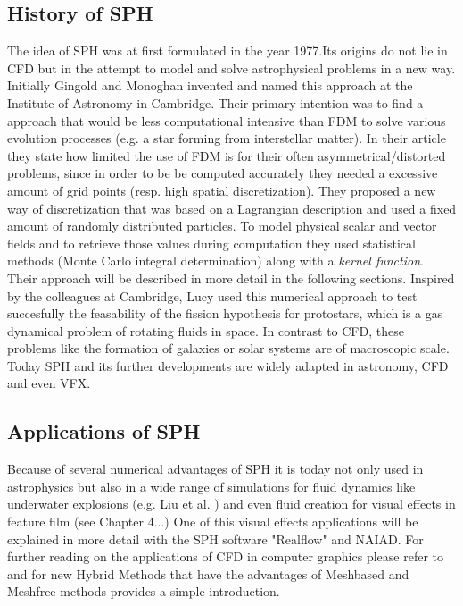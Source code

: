 \subsection{History of SPH}

The idea of SPH was at first formulated in the year 1977.Its origins do not lie in CFD but in the attempt to model and solve astrophysical problems in a new way. Initially Gingold and Monoghan \citep{Gingold1977} invented and named this approach at the Institute of Astronomy in Cambridge. Their primary intention was to find a approach that would be less computational intensive than FDM to solve various evolution processes (e.g. a star forming from interstellar matter). In their article they state how limited the use of FDM
is for their often asymmetrical/distorted problems, since in order to be be computed accurately they needed a excessive amount of grid points (resp. high spatial discretization). They proposed a new way of discretization that was based on a Lagrangian description and used a fixed amount of randomly distributed particles. To model physical scalar and vector fields and to retrieve those values during computation they used statistical methods (Monte Carlo integral determination) along with a \emph{kernel function}. Their approach will be described in more detail in the following sections.  
Inspired by the colleagues at Cambridge, Lucy \citep{Lucy1977} used this numerical approach to test succesfully the feasability of the fission hypothesis for protostars, which is a gas dynamical problem of rotating fluids in space. In contrast to CFD, these problems like the formation of galaxies or solar systems are of macroscopic scale.
Today SPH and its further developments are widely adapted in astronomy, CFD and even VFX. 


\subsection{Applications of SPH}
Because of several numerical advantages of SPH it is today not only used in astrophysics but also in a wide
range of simulations for fluid dynamics like underwater explosions (e.g. Liu et al. ) and even fluid creation
for visual effects in feature film (see Chapter 4...) One of this visual effects applications will be explained
in more detail with the SPH software "Realflow" and NAIAD. For further reading on the applications of CFD in computer graphics please refer to \citep{Bridson2008} and for new Hybrid Methods that have the advantages of Meshbased and Meshfree methods \citep[pg. 195]{Jackl2006} provides a simple introduction. 


